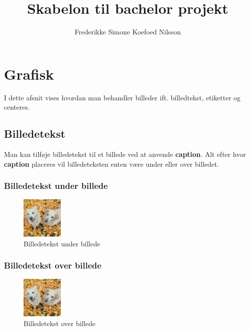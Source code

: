 \documentclass[11pt]{article}
\begin{document}
\begin{titlepage}
\title{Skabelon til bachelor projekt}
\author{Frederikke Simone Koefoed Nilsson}
\maketitle
\thispagestyle{empty} %
\end{titlepage}

\tableofcontents
\clearpage %

\section{Grafisk}
I dette afsnit vises hvordan man behandler billeder ift. billedtekst, etiketter og centeres.

\subsection{Billedetekst}
Man kan tilføje billedetekst til et billede ved at anvende \textbf{caption}. Alt efter hvor \textbf{caption} placeres vil billedeteksten enten være under eller over billedet. 

\subsubsection{Billedetekst under billede}
\begin{figure}[H] %
\centering
\includegraphics[width=2cm]{carlaogbella}
\caption{Billedetekst under billede}
\end{figure}

\subsubsection{Billedetekst over billede}
\begin{figure}[H] 
\centering
\caption{Billedetekst over billede}
\includegraphics[width=2cm]{carlaogbella}
\end{figure}
\end{document}
